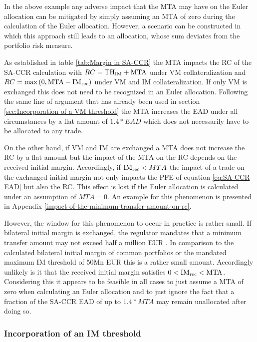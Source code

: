 \documentclass[../Thesis_AHoecherl.tex]{subfiles}
\begin{document}
    In the above example any adverse impact that the MTA may have on the Euler allocation can be mitigated by simply assuming an MTA of zero during the calculation of the Euler allocation.
    However, a scenario can be constructed in which this approach still leads to an allocation, whose sum deviates from the portfolio risk measure.

    As established in table \ref{tab:Margin in SA-CCR} the MTA impacts the RC of the \gls{SA-CCR} calculation with $RC = \text{TH\textsubscript{IM}} + \text{MTA}$ under VM collateralization and $RC = \max{\left(0, \text{MTA} - \text{IM\textsubscript{rec}}\right)}$ under VM and IM collateralization.
    If only VM is exchanged this does not need to be recognized in an Euler allocation. Following the same line of argument that has already been used in section \ref{sec:Incorporation of a VM threshold} the MTA increases the EAD under all circumstances by a flat amount of $1.4*EAD$ which does not necessarily have to be allocated to any trade.

    On the other hand, if VM and IM are exchanged a MTA does not increase the RC by a flat amount but the impact of the MTA on the RC depends on the received initial margin. Accordingly, if $\text{IM\textsubscript{rec}} < MTA$ the impact of a trade on the exchanged initial margin not only impacts the PFE of equation \ref{eq:SA-CCR EAD} but also the RC. This effect is lost if the Euler allocation is calculated under an assumption of $MTA = 0$. An example for this phenomenon is presented in Appendix \ref{impact-of-the-minimum-transfer-amount-on-rc}.

    However, the window for this phenomenon to occur in practice is rather small. If bilateral initial margin is exchanged, the regulator mandates that a minimum transfer amount may not exceed half a million EUR \cite[Requirement 2.3]{BCBS_MarginRequirements}.
    In comparison to the calculated bilateral initial margin of common portfolios or the mandated maximum IM threshold of 50Mn EUR \cite[Requirement 2.2]{BCBS_MarginRequirements} this is a rather small amount.
    Accordingly unlikely is it that the received initial margin satisfies $0<\text{IM\textsubscript{rec}}<\text{MTA}$.
    Considering this it appears to be feasible in all cases to just assume a MTA of zero when calculating an Euler allocation and to just ignore the fact that a fraction of the SA-CCR EAD of up to $1.4*MTA$ may remain unallocated after doing so.

    \subsubsection{Incorporation of an IM threshold\label{sec:Incorporation of an IM threshold}}
    
\end{document}
